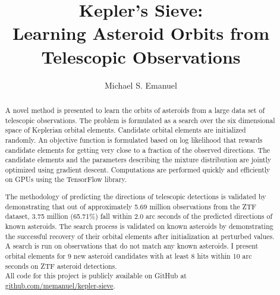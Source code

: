 \documentclass[11pt]{gsasthesis} %
\begin{document}
\title{Kepler's Sieve: \\Learning Asteroid Orbits from Telescopic Observations} %
\author{Michael S. Emanuel} %




\thesistitlepage
\copyrightpage

\begin{abstract}
A novel method is presented to learn the orbits of asteroids from a large data set of telescopic observations.
The problem is formulated as a search over the six dimensional space of Keplerian orbital elements.
Candidate orbital elements are initialized randomly.
An objective function is formulated based on log likelihood that rewards candidate elements for getting 
very close to a fraction of the observed directions.
The candidate elements and the parameters describing the mixture distribution are jointly optimized using gradient descent.
Computations are performed quickly and efficiently on GPUs using the TensorFlow library.

The methodology of predicting the directions of telescopic detections is validated by demonstrating 
that out of approximately 5.69 million observations from the ZTF dataset,
3.75 million (65.71\%) fall within 2.0 arc seconds of the predicted directions of known asteroids.
The search process is validated on known asteroids by demonstrating the successful recovery 
of their orbital elements after initialization at perturbed values.
A search is run on observations that do not match any known asteroids.
I present orbital elements for 9 new asteroid candidates with at least 8 hits within 10 arc seconds on ZTF asteroid detections.\\
All code for this project is publicly available on GitHub at \href{https://github.com/memanuel/kepler-sieve}{github.com/memanuel/kepler-sieve}.

\end{abstract}
\end{document}
